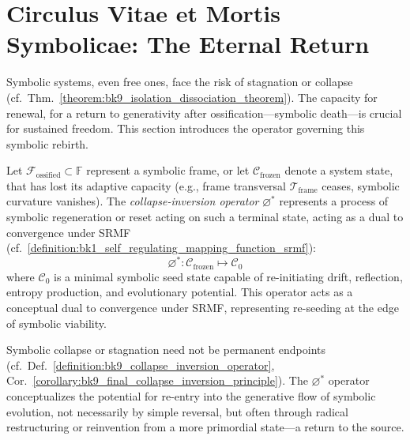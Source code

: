 \section{Circulus Vitae et Mortis Symbolicae: The Eternal Return}
\label{sec:bk9_circulus_vitae_et_mortis_symbolicae}
Symbolic systems, even free ones, face the risk of stagnation or collapse (cf.~Thm.~\ref{theorem:bk9_isolation_dissociation_theorem}). The capacity for renewal, for a return to generativity after ossification—symbolic death—is crucial for sustained freedom. This section introduces the operator governing this symbolic rebirth.
\begin{definition}
\label{definition:bk9_collapse_inversion_operator}
Let $\mathcal{F}_\text{ossified} \subset \mathbb{F}$ represent a symbolic frame, or let $\mathcal{C}_{\text{frozen}}$ denote a system state, that has lost its adaptive capacity (e.g., frame transversal $\mathcal{T}_{\text{frame}}$ ceases, symbolic curvature vanishes). The \emph{collapse-inversion operator} $\varnothing^*$ represents a process of symbolic regeneration or reset acting on such a terminal state, acting as a dual to convergence under SRMF (cf.~\ref{definition:bk1_self_regulating_mapping_function_srmf}):
\[
\varnothing^* : \mathcal{C}_{\text{frozen}} \mapsto \mathcal{C}_0
\]
where $\mathcal{C}_0$ is a minimal symbolic seed state capable of re-initiating drift, reflection, entropy production, and evolutionary potential. This operator acts as a conceptual dual to convergence under SRMF, representing re-seeding at the edge of symbolic viability.
\end{definition}
\begin{remark}[Redemption]
\label{remark:bk9_redemption}
Symbolic collapse or stagnation need not be permanent endpoints (cf.~Def.~\ref{definition:bk9_collapse_inversion_operator}, Cor.~\ref{corollary:bk9_final_collapse_inversion_principle}). The $\varnothing^*$ operator conceptualizes the potential for re-entry into the generative flow of symbolic evolution, not necessarily by simple reversal, but often through radical restructuring or reinvention from a more primordial state—a return to the source.
\end{remark}
